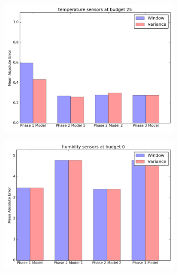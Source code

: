 \documentclass{article}
\begin{document}
\begin{figure}[h!]
	\begin{subfigure}{\linewidth}
	\includegraphics[scale=0.5]{temperature_25_final.png}
	\end{subfigure}
	\begin{subfigure}{\linewidth}
	\includegraphics[scale=0.5]{humidity_0_final.png}
	\end{subfigure}
\end{figure}

\newpage
\end{document}
